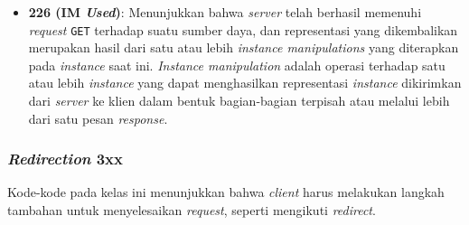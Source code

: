 \begin{itemize}
  
    \item \textbf{226 (IM \textit{Used})}: Menunjukkan bahwa \textit{server} telah berhasil memenuhi \textit{request} \texttt{GET} terhadap suatu sumber daya, dan representasi yang dikembalikan merupakan hasil dari satu atau lebih \textit{instance manipulations} yang diterapkan pada \textit{instance} saat ini. \textit{Instance manipulation} adalah operasi terhadap satu atau lebih \textit{instance} yang dapat menghasilkan representasi \textit{instance} dikirimkan dari \textit{server} ke klien dalam bentuk bagian-bagian terpisah atau melalui lebih dari satu pesan \textit{response}.~\cite{RFC3229}
  
\end{itemize}

\subsubsection{\textit{Redirection} 3xx}
\label{subsubsec:020104-redirection-3xx}

Kode-kode pada kelas ini menunjukkan bahwa \textit{client} harus melakukan langkah tambahan untuk menyelesaikan \textit{request}, seperti mengikuti \textit{redirect}.

